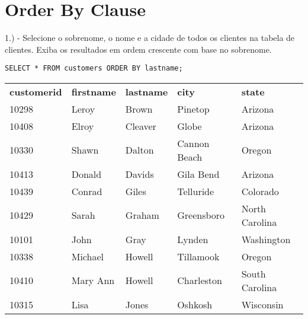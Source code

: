 \newpage

\section{Order By Clause}

1.) - Selecione o sobrenome, o nome e a cidade de todos os clientes na tabela de clientes. Exiba os resultados em ordem crescente com base no sobrenome.

\begin{lstlisting}
SELECT * FROM customers ORDER BY lastname;
\end{lstlisting}

\begin{tabular}{lllll}
    {\textbf{customerid}} & {\textbf{firstname}} & {\textbf{lastname}} & \textbf{city} & \textbf{state} \\
    {10298}               & {Leroy}              & {Brown}             & Pinetop       & Arizona        \\
    {10408}               & {Elroy}              & {Cleaver}           & Globe         & Arizona        \\
    {10330}               & {Shawn}              & {Dalton}            & Cannon Beach  & Oregon         \\
    {10413}               & {Donald}             & {Davids}            & Gila Bend     & Arizona        \\
    {10439}               & {Conrad}             & {Giles}             & Telluride     & Colorado       \\
    {10429}               & {Sarah}              & {Graham}            & Greensboro    & North Carolina \\
    {10101}               & {John}               & {Gray}              & Lynden        & Washington     \\
    {10338}               & {Michael}            & {Howell}            & Tillamook     & Oregon         \\
    10410                                                              & Mary Ann                                                          & Howell                                                           & Charleston    & South Carolina \\
    10315                                                              & Lisa                                                              & Jones                                                            & Oshkosh       & Wisconsin      \\

\end{tabular}
